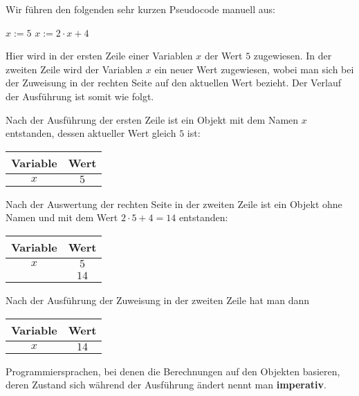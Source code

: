\begin{bsp} Wir führen den folgenden sehr kurzen Pseudocode manuell aus: 
\begin{center}
	\begin{algorithmic}[1]
		\STATE $x:=5$ 
		\STATE $x:=2 \cdot x + 4$
	\end{algorithmic}
\end{center}

Hier wird in der ersten Zeile einer Variablen $x$ der Wert $5$ zugewiesen. 
In der zweiten Zeile wird der Variablen $x$ ein neuer Wert zugewiesen, wobei man sich bei der Zuweisung in der rechten Seite auf den aktuellen Wert bezieht. Der Verlauf der Ausführung ist somit wie folgt. 

Nach der Ausführung der ersten Zeile ist ein Objekt mit dem Namen $x$ entstanden, dessen aktueller Wert gleich $5$ ist: 

\begin{center} 
\begin{tabular}{c|c}
	Variable & Wert
	\\ \hline 
	$x$ & $5$ 
\end{tabular} 
\end{center} 

Nach der Auswertung der rechten Seite in der zweiten Zeile ist ein Objekt ohne Namen und mit dem Wert $2 \cdot 5 + 4 = 14$ entstanden:

\begin{center} 
\begin{tabular}{c|c}
	Variable & Wert
	\\ \hline 
	$x$ & $5$  \\
	 & $14$ 
\end{tabular} 
\end{center} 

Nach der Ausführung der Zuweisung in der zweiten Zeile hat man dann

\begin{center} 
	\begin{tabular}{c|c}
		Variable & Wert
		\\ \hline 
		$x$ & $14$  
	\end{tabular} 
\end{center} 
\end{bsp} 


\begin{defn}
	Programmiersprachen, bei denen die Berechnungen auf den Objekten basieren, deren Zustand sich während der Ausführung ändert nennt man \textbf{imperativ}. 
\end{defn} 

